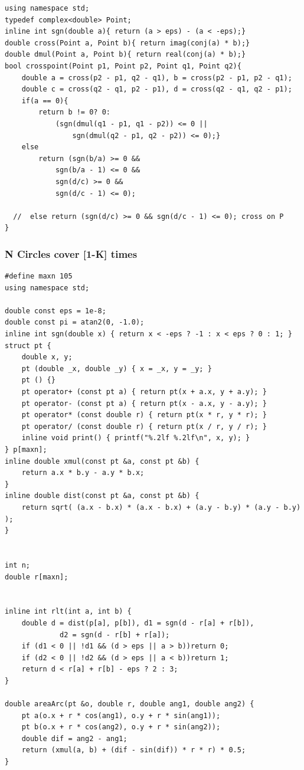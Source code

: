 \documentclass[a4paper]{article}
\begin{document}
\begin{CJK*}{UTF8}{gbsn}
\begin{multicols}{3}
\begin{flushleft}
\begin{lstlisting}
using namespace std;
typedef complex<double> Point;
inline int sgn(double a){ return (a > eps) - (a < -eps);}
double cross(Point a, Point b){ return imag(conj(a) * b);}
double dmul(Point a, Point b){ return real(conj(a) * b);}
bool crosspoint(Point p1, Point p2, Point q1, Point q2){
    double a = cross(p2 - p1, q2 - q1), b = cross(p2 - p1, p2 - q1);
    double c = cross(q2 - q1, p2 - p1), d = cross(q2 - q1, q2 - p1);
    if(a == 0){
        return b != 0? 0:
            (sgn(dmul(q1 - p1, q1 - p2)) <= 0 ||
                sgn(dmul(q2 - p1, q2 - p2)) <= 0);}
    else
        return (sgn(b/a) >= 0 &&
            sgn(b/a - 1) <= 0 &&
            sgn(d/c) >= 0 &&
            sgn(d/c - 1) <= 0);

  //  else return (sgn(d/c) >= 0 && sgn(d/c - 1) <= 0); cross on P
}
\end{lstlisting}

\subsubsection{N Circles cover [1-K] times}
\begin{lstlisting}
#define maxn 105
using namespace std;

double const eps = 1e-8;
double const pi = atan2(0, -1.0);
inline int sgn(double x) { return x < -eps ? -1 : x < eps ? 0 : 1; }
struct pt {
    double x, y;
    pt (double _x, double _y) { x = _x, y = _y; }
    pt () {}
    pt operator+ (const pt a) { return pt(x + a.x, y + a.y); }
    pt operator- (const pt a) { return pt(x - a.x, y - a.y); }
    pt operator* (const double r) { return pt(x * r, y * r); }
    pt operator/ (const double r) { return pt(x / r, y / r); }
    inline void print() { printf("%.2lf %.2lf\n", x, y); }
} p[maxn];
inline double xmul(const pt &a, const pt &b) {
    return a.x * b.y - a.y * b.x;
}
inline double dist(const pt &a, const pt &b) {
    return sqrt( (a.x - b.x) * (a.x - b.x) + (a.y - b.y) * (a.y - b.y) );
}


int n;
double r[maxn];


inline int rlt(int a, int b) {
	double d = dist(p[a], p[b]), d1 = sgn(d - r[a] + r[b]),
             d2 = sgn(d - r[b] + r[a]);
	if (d1 < 0 || !d1 && (d > eps || a > b))return 0;
	if (d2 < 0 || !d2 && (d > eps || a < b))return 1;
	return d < r[a] + r[b] - eps ? 2 : 3;
}

double areaArc(pt &o, double r, double ang1, double ang2) {
    pt a(o.x + r * cos(ang1), o.y + r * sin(ang1));
    pt b(o.x + r * cos(ang2), o.y + r * sin(ang2));
    double dif = ang2 - ang1;
    return (xmul(a, b) + (dif - sin(dif)) * r * r) * 0.5;
}


\end{lstlisting}
\end{flushleft}
\end{multicols}
\end{CJK*}
\end{document}
